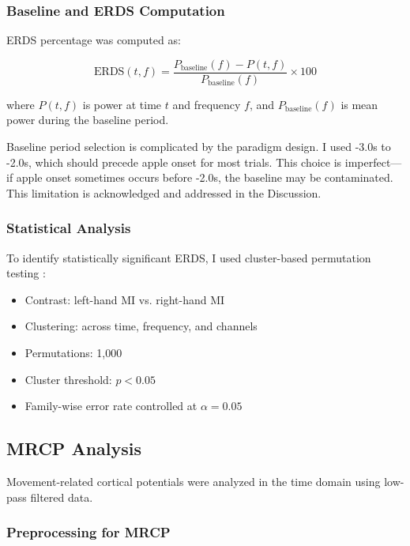\subsubsection{Baseline and ERDS Computation}

ERDS percentage was computed as:

\begin{equation}
    \text{ERDS}(t, f) = \frac{P_{\text{baseline}}(f) - P(t, f)}{P_{\text{baseline}}(f)} \times 100
\end{equation}

where $P(t, f)$ is power at time $t$ and frequency $f$, and $P_{\text{baseline}}(f)$ is mean power during the baseline period.

Baseline period selection is complicated by the paradigm design. I used -3.0s to -2.0s, which should precede apple onset for most trials. This choice is imperfect—if apple onset sometimes occurs before -2.0s, the baseline may be contaminated. This limitation is acknowledged and addressed in the Discussion.

\subsubsection{Statistical Analysis}

To identify statistically significant ERDS, I used cluster-based permutation testing \cite{maris2007nonparametric}:

\begin{itemize}
    \item Contrast: left-hand MI vs. right-hand MI
    \item Clustering: across time, frequency, and channels
    \item Permutations: 1,000
    \item Cluster threshold: $p < 0.05$
    \item Family-wise error rate controlled at $\alpha = 0.05$
\end{itemize}


\subsection{MRCP Analysis}
\label{subsec:methods_mrcp}

Movement-related cortical potentials were analyzed in the time domain using low-pass filtered data.

\subsubsection{Preprocessing for MRCP}

